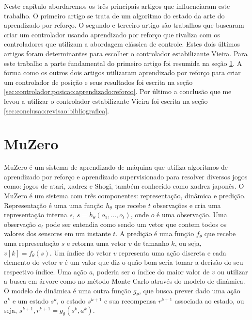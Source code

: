 
\label{Cap:TrabalhosRelacionados}
Neste capítulo abordaremos os três principais artigos que influenciaram
este trabalho. O primeiro artigo se trata de um algoritmo do estado
da arte do aprendizado por reforço. O segundo e terceiro artigo são
trabalhos que buscaram criar um controlador usando aprendizado por reforço
que rivaliza com os controladores que utilizam a abordagem clássica de controle.
Estes dois últimos artigos foram determinantes para escolher o controlador
estabilizante Vieira. Para este trabalho a parte fundamental do primeiro artigo
foi resumida na seção \ref{sec:muzero}. A forma como os outros dois artigos
utilizaram aprendizado por reforço para criar um controlador de posição e seus
resultados foi escrita na seção \ref{sec:controlador:posicao:aprendizado:reforco}.
Por último a conclusão que me levou a utilizar o controlador estabilizante Vieira
foi escrita na seção \ref{sec:conclusao:revisao:bibliografica}.

\section{MuZero}
\label{sec:muzero}

MuZero é um sistema de aprendizado de máquina que utiliza algoritmos de
aprendizado por reforço e aprendizado supervisionado para
resolver diversos jogos como: jogos de atari, xadrez e Shogi, também conhecido como
xadrez japonês. O MuZero é um sistema com três componentes:
representação, dinâmica e predição. Representação é uma uma
função $h_{\theta}$  que recebe $t$ observações 
e cria uma representação interna $s$, $s = h_{\theta}(o_1,...,o_t)$,
onde $o$ é uma observação. Uma observação $o_t$ pode ser entendia como sendo
um vetor que contem todos os valores dos sensores em um instante $t$.
A predição é uma função $f_{\theta}$ que recebe uma representação $s$
e retorna uma vetor $v$ de tamanho $k$, ou seja,  $v[k] =  f_{\theta}(s)$.
Um índice do vetor $v$ representa uma ação discreta e cada elemento do vetor $v$ é um valor que diz o quão bom
seria tomar a decisão do seu respectivo índice.
Uma ação $a$, poderia ser o índice do maior
valor de $v$ ou utilizar a busca em árvore como no método Monte Carlo
através do modelo de dinâmica. O modelo de dinâmica é uma outra função
$g_{\theta}$, que busca prever dado uma ação $a^k$ e um estado $s^{k}$,
o estado $s^{k+1}$ e sua recompensa $r^{k+1}$ associada ao estado,
ou seja, $s^{k+1},r^{k+1}=  g_{\theta}(s^{k},a^k)$.


